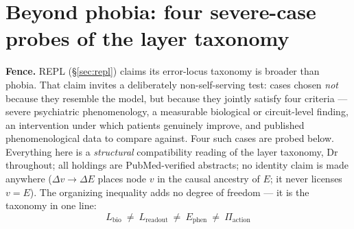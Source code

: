 \documentclass[9pt,twocolumn]{article}
\begin{document}
\section{Beyond phobia: four severe-case probes of the layer taxonomy}
\label{sec:probes}
\textbf{Fence.} REPL (\S\ref{sec:repl}) claims its error-locus taxonomy is broader than phobia. That claim invites a deliberately non-self-serving test: cases chosen \emph{not} because they resemble the model, but because they jointly satisfy four criteria --- severe psychiatric phenomenology, a measurable biological or circuit-level finding, an intervention under which patients genuinely improve, and published phenomenological data to compare against. Four such cases are probed below. Everything here is a \emph{structural} compatibility reading of the layer taxonomy, Dr throughout; all holdings are PubMed-verified abstracts; no identity claim is made anywhere ($\Delta v\to\Delta E$ places node $v$ in the causal ancestry of $E$; it never licenses $v=E$). The organizing inequality adds no degree of freedom --- it is the taxonomy in one line:
\[
\boxed{\,L_{\mathrm{bio}}\ \neq\ L_{\mathrm{readout}}\ \neq\ E_{\mathrm{phen}}\ \neq\ \Pi_{\mathrm{action}}\,}
\]
\end{document}
